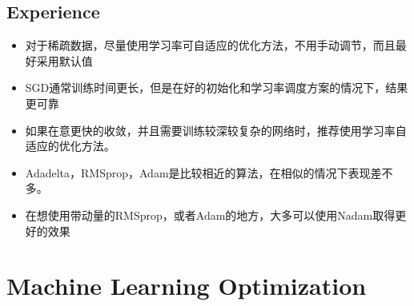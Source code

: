 \documentclass[hyperref, UTF-8]{ctexart}
\begin{document}
\subsection{Experience}
\begin{itemize}
\item 对于稀疏数据，尽量使用学习率可自适应的优化方法，不用手动调节，而且最好采用默认值
\item SGD通常训练时间更长，但是在好的初始化和学习率调度方案的情况下，结果更可靠
\item 如果在意更快的收敛，并且需要训练较深较复杂的网络时，推荐使用学习率自适应的优化方法。
\item Adadelta，RMSprop，Adam是比较相近的算法，在相似的情况下表现差不多。
\item 在想使用带动量的RMSprop，或者Adam的地方，大多可以使用Nadam取得更好的效果
\end{itemize}
\section{Machine Learning Optimization}
\end{document}
